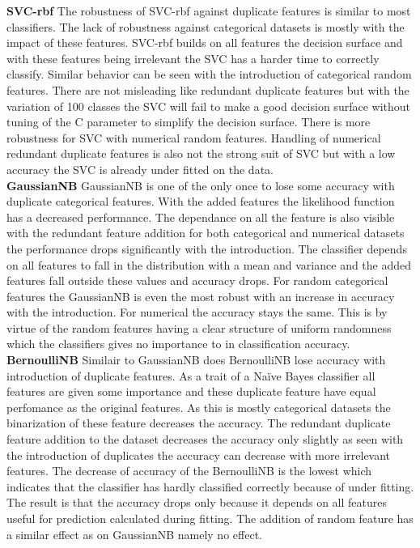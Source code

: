 \documentclass[a4paper,10pt]{article}
\begin{document}
\textbf{SVC-rbf} The robustness of SVC-rbf against duplicate features is similar to most classifiers. The lack of robustness against categorical datasets is mostly with the impact of these features. SVC-rbf builds on all features the decision surface and with these features being irrelevant the SVC has a harder time to correctly classify. Similar behavior can be seen with the introduction of categorical random features. There are not misleading like redundant duplicate features but with the variation of 100 classes the SVC will fail to make a good decision surface without tuning of the C parameter to simplify the decision surface. There is more robustness for SVC with numerical random features. Handling of numerical redundant duplicate features is also not the strong suit of SVC but with a low accuracy the SVC is already under fitted on the data.  \\

\textbf{GaussianNB} GaussianNB is one of the only once to lose some accuracy with duplicate categorical features. With the added features the likelihood function has a decreased performance. The dependance on all the feature is also visible with the redundant feature addition for both categorical and numerical datasets the performance drops significantly with the introduction. The classifier depends on all features to fall in the distribution with a mean and variance and the added features fall outside these values and accuracy drops. For random categorical features the GaussianNB is even the most robust with an increase in accuracy with the introduction. For numerical the accuracy stays the same. This is by virtue of the random features having a clear structure of uniform randomness which the classifiers gives no importance to in classification accuracy.   \\

\textbf{BernoulliNB} Similair to GaussianNB does BernoulliNB lose accuracy with introduction of duplicate features. As a trait of a Naïve Bayes classifier all features are given some importance and these duplicate feature have equal perfomance as the original features. As this is mostly categorical datasets  the binarization of these feature decreases the accuracy. The redundant duplicate feature addition to the dataset decreases the accuracy only slightly as seen with the introduction of duplicates the accuracy can decrease with more irrelevant features. The decrease of accuracy of the BernoulliNB is the lowest which indicates that the classifier has hardly classified correctly because of under fitting. The result is that the accuracy drops only because it depends on all features useful for prediction calculated during fitting. The addition of random feature has a similar effect as on GaussianNB namely no effect. \\
\end{document}
